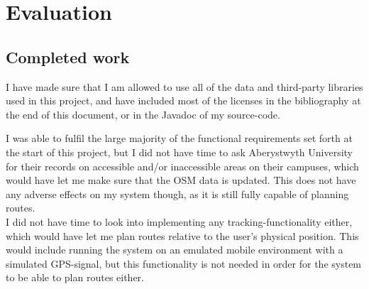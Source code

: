 \chapter{Evaluation}





\section{Completed work}
I have made sure that I am allowed to use all of the data and third-party libraries used in this project, and have included most of the licenses in the bibliography at the end of this document, or in the Javadoc of my source-code.

I was able to fulfil the large majority of the functional requirements set forth at the start of this project, but I did not have time to ask Aberystwyth University for their records on accessible and/or inaccessible areas on their campuses, which would have let me make sure that the OSM data is updated. This does not have any adverse effects on my system though, as it is still fully capable of planning routes.\\
I did not have time to look into implementing any tracking-functionality either, which would have let me plan routes relative to the user's physical position. This would include running the system on an emulated mobile environment with a simulated GPS-signal, but this functionality is not needed in order for the system to be able to plan routes either.


